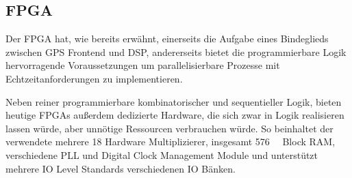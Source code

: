 \subsection{FPGA}
Der FPGA hat, wie bereits erwähnt, einerseits die Aufgabe eines Bindeglieds zwischen GPS Frontend und DSP, andererseits bietet die programmierbare Logik hervorragende Voraussetzungen um parallelisierbare Prozesse mit Echtzeitanforderungen zu implementieren. 

Neben reiner programmierbare kombinatorischer und sequentieller Logik, bieten heutige FPGAs außerdem dedizierte Hardware, die sich zwar in Logik realisieren lassen würde, aber unnötige Ressourcen verbrauchen würde. So beinhaltet der verwendete \comfpga mehrere \SI{18}{\bit} Hardware Multiplizierer, insgesamt \SI{576}{\kilo\bit} Block RAM, verschiedene PLL und Digital Clock Management Module und unterstützt mehrere IO Level Standards verschiedenen IO Bänken.